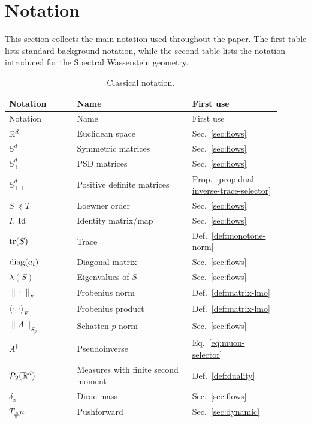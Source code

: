 \section{Notation}
\label{sec:notation}

This section collects the main notation used throughout the paper. The first table lists standard background notation, while the second table lists the notation introduced for the Spectral Wasserstein geometry.

\begin{longtable}{@{}p{0.23\linewidth}p{0.39\linewidth}p{0.28\linewidth}@{}}
\caption{Classical notation.}\label{tab:notation-classical}\\
\toprule
Notation & Name & First use \\
\midrule
\endfirsthead
\toprule
Notation & Name & First use \\
\midrule
\endhead
\bottomrule
\endfoot
$\mathbb{R}^d$ & Euclidean space & Sec.~\ref{sec:flows} \\
$\mathbb S^d$ & Symmetric matrices & Sec.~\ref{sec:flows} \\
$\mathbb S_+^d$ & PSD matrices & Sec.~\ref{sec:flows} \\
$\mathbb S_{++}^d$ & Positive definite matrices & Prop.~\ref{prop:dual-inverse-trace-selector} \\
$S\preceq T$ & Loewner order & Sec.~\ref{sec:flows} \\
$I$, $\mathrm{Id}$ & Identity matrix/map & Sec.~\ref{sec:flows} \\
$\operatorname{tr}(S)$ & Trace & Def.~\ref{def:monotone-norm} \\
$\operatorname{diag}(a_i)$ & Diagonal matrix & Sec.~\ref{sec:flows} \\
$\lambda(S)$ & Eigenvalues of $S$ & Sec.~\ref{sec:flows} \\
$\|\cdot\|_F$ & Frobenius norm & Def.~\ref{def:matrix-lmo} \\
$\langle\cdot,\cdot\rangle_F$ & Frobenius product & Def.~\ref{def:matrix-lmo} \\
$\|A\|_{S_p}$ & Schatten $p$-norm & Sec.~\ref{sec:flows} \\
$A^\dagger$ & Pseudoinverse & Eq.~\eqref{eq:muon-selector} \\
$\mathcal{P}_2(\mathbb{R}^d)$ & Measures with finite second moment & Def.~\ref{def:duality} \\
$\delta_x$ & Dirac mass & Sec.~\ref{sec:flows} \\
$T_\#\mu$ & Pushforward & Sec.~\ref{sec:dynamic} \\

\end{longtable}
